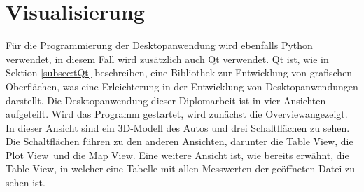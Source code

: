 \section{Visualisierung}
\label{sec:DesktopApp}
Für die Programmierung der Desktopanwendung wird ebenfalls Python verwendet, in diesem Fall wird zusätzlich auch Qt verwendet. Qt ist, wie in Sektion \ref{subsec:tQt} beschreiben, eine Bibliothek zur Entwicklung von grafischen Oberflächen, was eine Erleichterung in der Entwicklung von Desktopanwendungen darstellt. Die Desktopanwendung dieser Diplomarbeit ist in vier Ansichten aufgeteilt. Wird das Programm gestartet, wird zunächst die \glqq Overview\grqq angezeigt. In dieser Ansicht sind ein \ac{3D}-Modell des Autos und drei Schaltflächen zu sehen. Die Schaltflächen führen zu den anderen Ansichten, darunter die \glqq Table View\grqq , die \glqq Plot View\grqq \ und die \glqq Map View\grqq . Eine weitere Ansicht ist, wie bereits erwähnt, die \glqq Table View\grqq , in welcher eine Tabelle mit allen Messwerten der geöffneten Datei zu sehen ist.
